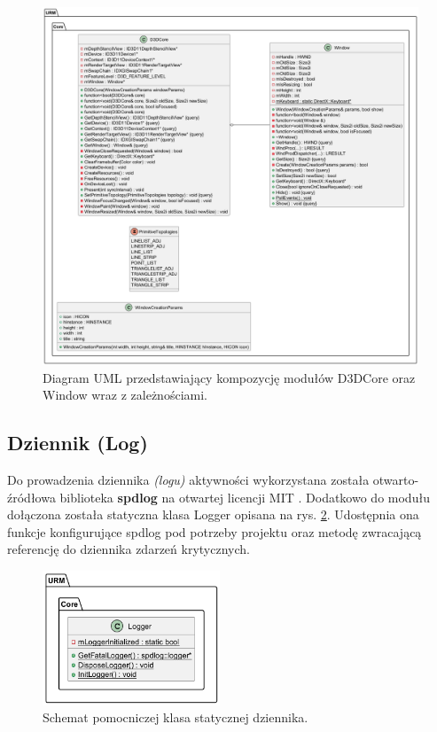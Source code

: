 	\begin{figure}[h!]
		\centering
		\includegraphics[width=\textwidth]{images/UML/core.png}
		\caption{Diagram UML przedstawiający kompozycję modułów D3DCore oraz Window wraz z zależnościami.}
		\label{UML_D3DCore}
	\end{figure}
	
\subsection{Dziennik (Log)}
	Do prowadzenia dziennika \textit{(logu)} aktywności wykorzystana została otwarto-źródłowa biblioteka \textbf{spdlog} na otwartej licencji MIT \cite{github:spdlog:spdlog}. Dodatkowo do modułu dołączona została statyczna klasa Logger opisana na rys. \ref{UML_Logger}. Udostępnia ona funkcje konfigurujące spdlog pod potrzeby projektu oraz metodę zwracającą referencję do dziennika zdarzeń krytycznych.
	

	\vfill
	\clearpage

	\begin{figure}[h!]
		\centering
		\includegraphics[width=200px]{images/UML/logging.png}
		\caption{Schemat pomocniczej klasa statycznej dziennika.}
		\label{UML_Logger}
	\end{figure}

